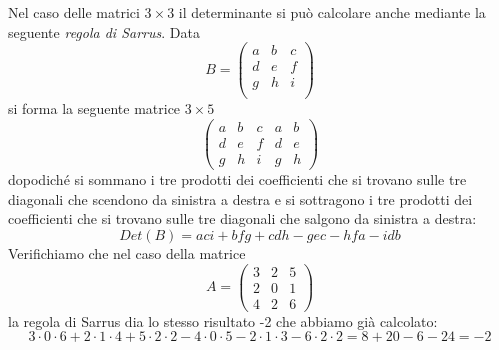 \begin{observation}
	Nel caso delle matrici $3 \times 3$ il determinante si pu\`o calcolare
	anche mediante la seguente \emph{regola di Sarrus}. Data
	\begin{equation*}
		B = \begin{pmatrix}
			a & b & c \\
			d & e & f \\
			g & h & i \\
		\end{pmatrix}
	\end{equation*}
	si forma la seguente matrice $3 \times 5$
	\begin{equation*}
		\begin{pmatrix}
			a & b & c & a & b \\
			d & e & f & d & e \\
			g & h & i & g & h
		\end{pmatrix}
	\end{equation*}
	dopodich\'e si sommano i tre prodotti dei coefficienti che si trovano sulle
	tre diagonali che scendono da sinistra a destra e si sottragono i tre
	prodotti dei coefficienti che si trovano sulle tre diagonali che salgono
	da sinistra a destra:
	\begin{equation*}
		Det(B) = aci + bfg + cdh - gec - hfa - idb
	\end{equation*}
	Verifichiamo che nel caso della matrice
	\begin{equation*}
		A = \begin{pmatrix}
			3 & 2 & 5 \\
			2 & 0 & 1 \\
			4 & 2 & 6
		\end{pmatrix}
	\end{equation*}
	la regola di Sarrus dia lo stesso risultato -2 che abbiamo gi\`a calcolato:
	\begin{equation*}
		3 \cdot 0 \cdot 6 + 2 \cdot 1 \cdot 4 + 5 \cdot 2 \cdot 2 -
		4 \cdot 0 \cdot 5 - 2 \cdot 1 \cdot 3 - 6 \cdot 2 \cdot 2 =
		8 + 20 - 6 - 24 = -2
	\end{equation*}
\end{observation}
